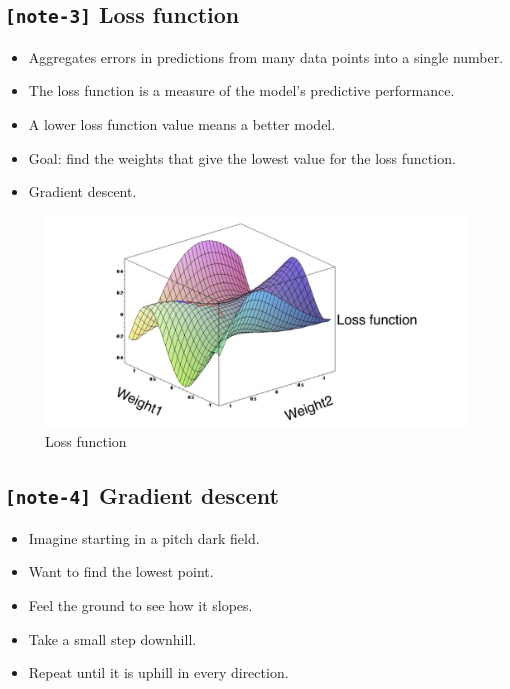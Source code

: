 \documentclass[11pt, twoside]{article}
\begin{document}
    \hypertarget{note-3-loss-function}{%
\subsection{\texorpdfstring{\texttt{{[}note-3{]}} Loss
function}{{[}note-3{]} Loss function}}\label{note-3-loss-function}}

\begin{itemize}
\item
  Aggregates errors in predictions from many data points into a single
  number.
\item
  The loss function is a measure of the model's predictive performance.
\item
  A lower loss function value means a better model.
\item
  Goal: find the weights that give the lowest value for the loss
  function.
\item
  Gradient descent.
\end{itemize}

\begin{figure}
\centering
\includegraphics{../Figures/2. Loss function.jpg}
\caption{Loss function}
\end{figure}

    \hypertarget{note-4-gradient-descent}{%
\subsection{\texorpdfstring{\texttt{{[}note-4{]}} Gradient
descent}{{[}note-4{]} Gradient descent}}\label{note-4-gradient-descent}}

\begin{itemize}
\item
  Imagine starting in a pitch dark field.
\item
  Want to find the lowest point.
\item
  Feel the ground to see how it slopes.
\item
  Take a small step downhill.
\item
  Repeat until it is uphill in every direction.
\end{itemize}
\end{document}
